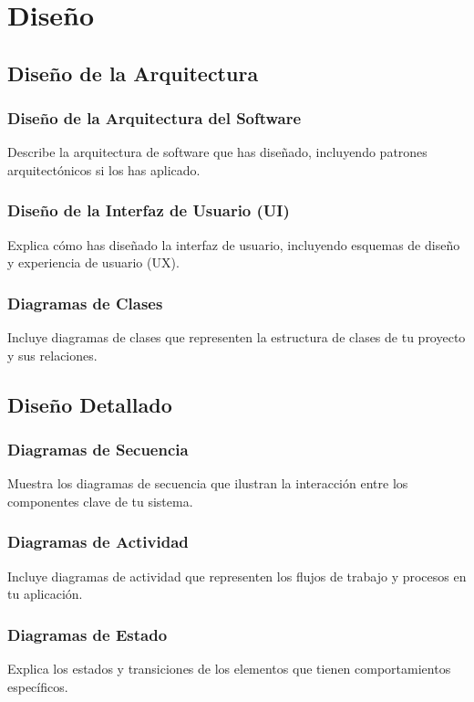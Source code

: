 \section{Diseño}

\subsection{Diseño de la Arquitectura}

\subsubsection{Diseño de la Arquitectura del Software}
Describe la arquitectura de software que has diseñado, incluyendo patrones arquitectónicos si los has aplicado.

\subsubsection{Diseño de la Interfaz de Usuario (UI)}
Explica cómo has diseñado la interfaz de usuario, incluyendo esquemas de diseño y experiencia de usuario (UX).

\subsubsection{Diagramas de Clases}
Incluye diagramas de clases que representen la estructura de clases de tu proyecto y sus relaciones.

\subsection{Diseño Detallado}

\subsubsection{Diagramas de Secuencia}
Muestra los diagramas de secuencia que ilustran la interacción entre los componentes clave de tu sistema.

\subsubsection{Diagramas de Actividad}
Incluye diagramas de actividad que representen los flujos de trabajo y procesos en tu aplicación.

\subsubsection{Diagramas de Estado}
Explica los estados y transiciones de los elementos que tienen comportamientos específicos.

